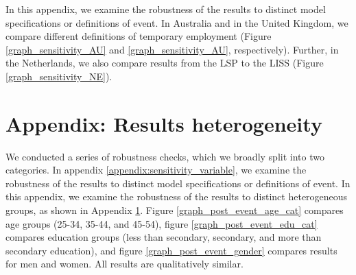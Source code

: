 In this appendix, we examine the robustness of the results to distinct model specifications or definitions of event.  In Australia and in the United Kingdom, we compare different definitions of temporary employment (Figure \ref{graph_sensitivity_AU} and \ref{graph_sensitivity_AU}, respectively).  Further, in the Netherlands, we also compare results from the LSP to the LISS (Figure \ref{graph_sensitivity_NE}).  



\begin{sidewaysfigure}[!h]
    \caption{Australia: All temporary (incl. casual) vs. FTC only (as in the paper)}
    \label{graph_sensitivity_AU}
\end{sidewaysfigure}


\begin{sidewaysfigure}
    \caption{United Kingdom: All temporary (as in the paper) vs. FTC only}
    \label{graph_sensitivity_UK}
\end{sidewaysfigure}

\begin{sidewaysfigure}
    \caption{Netherlands: LSP (as in the paper) vs. LISS}
    \label{graph_sensitivity_NE}
\end{sidewaysfigure}



\clearpage
\setcounter{table}{0}
\setcounter{figure}{0}
\renewcommand*\thetable{\Alph{section}.\arabic{table}}
\renewcommand*\thefigure{\Alph{section}.\arabic{figure}}
\renewcommand{\theHfigure}{\Alph{section}.\arabic{table}}
\renewcommand{\theHtable}{\Alph{section}.\arabic{figure}}

\section{Appendix: Results heterogeneity}\label{appendix:sensitivity_heterogeneity}

We conducted a series of robustness checks, which we broadly split into two categories.  In appendix \ref{appendix:sensitivity_variable}, we examine the robustness of the results to distinct model specifications or definitions of event.  In this appendix, we examine the robustness of the results to distinct heterogeneous groups, as shown in Appendix \ref{appendix:sensitivity_heterogeneity}.  Figure \ref{graph_post_event_age_cat} compares age groups (25-34, 35-44, and 45-54), figure \ref{graph_post_event_edu_cat} compares education groups (less than secondary, secondary, and more than secondary education), and figure \ref{graph_post_event_gender} compares results for men and women.  All results are qualitatively similar.

